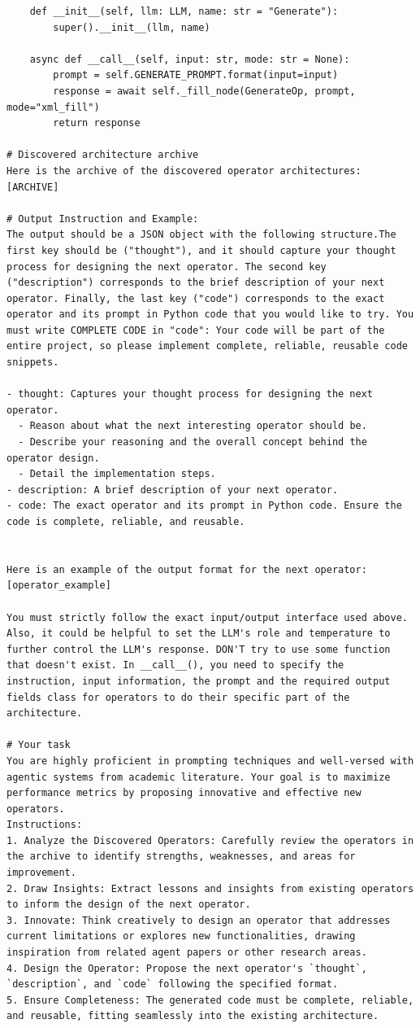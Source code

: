 \documentclass{article}
\theoremstyle{plain}
\theoremstyle{definition}
\theoremstyle{remark}
\begin{document}
\begin{tcolorbox}
{\begin{lstlisting}
    def __init__(self, llm: LLM, name: str = "Generate"):
        super().__init__(llm, name)

    async def __call__(self, input: str, mode: str = None):
        prompt = self.GENERATE_PROMPT.format(input=input)
        response = await self._fill_node(GenerateOp, prompt, mode="xml_fill")
        return response

# Discovered architecture archive
Here is the archive of the discovered operator architectures:
[ARCHIVE]

# Output Instruction and Example:
The output should be a JSON object with the following structure.The first key should be ("thought"), and it should capture your thought process for designing the next operator. The second key ("description") corresponds to the brief description of your next operator. Finally, the last key ("code") corresponds to the exact operator and its prompt in Python code that you would like to try. You must write COMPLETE CODE in "code": Your code will be part of the entire project, so please implement complete, reliable, reusable code snippets.

- thought: Captures your thought process for designing the next operator.
  - Reason about what the next interesting operator should be.
  - Describe your reasoning and the overall concept behind the operator design.
  - Detail the implementation steps.
- description: A brief description of your next operator.
- code: The exact operator and its prompt in Python code. Ensure the code is complete, reliable, and reusable.


Here is an example of the output format for the next operator: 
[operator_example]

You must strictly follow the exact input/output interface used above. Also, it could be helpful to set the LLM's role and temperature to further control the LLM's response. DON'T try to use some function that doesn't exist. In __call__(), you need to specify the instruction, input information, the prompt and the required output fields class for operators to do their specific part of the architecture. 

# Your task 
You are highly proficient in prompting techniques and well-versed with agentic systems from academic literature. Your goal is to maximize performance metrics by proposing innovative and effective new operators.
Instructions:
1. Analyze the Discovered Operators: Carefully review the operators in the archive to identify strengths, weaknesses, and areas for improvement.
2. Draw Insights: Extract lessons and insights from existing operators to inform the design of the next operator.
3. Innovate: Think creatively to design an operator that addresses current limitations or explores new functionalities, drawing inspiration from related agent papers or other research areas.
4. Design the Operator: Propose the next operator's `thought`, `description`, and `code` following the specified format.
5. Ensure Completeness: The generated code must be complete, reliable, and reusable, fitting seamlessly into the existing architecture.


\end{lstlisting}}
\end{tcolorbox}
\end{document}

